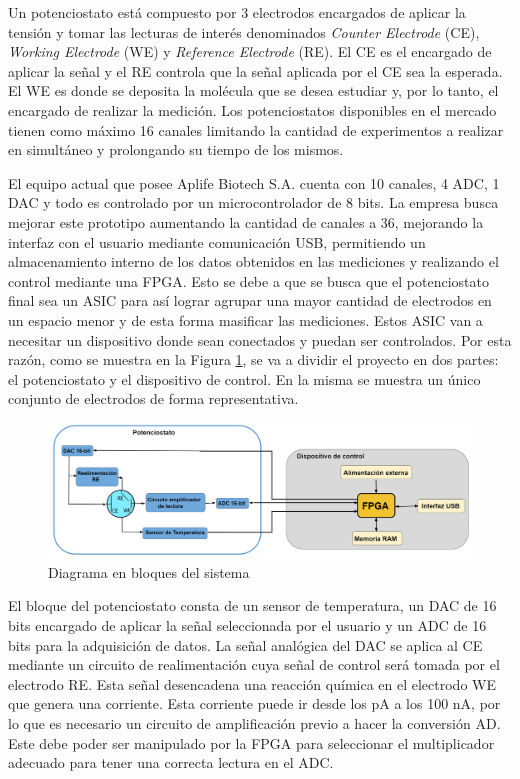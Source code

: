 \documentclass[11pt]{charter}
\begin{document}
Un potenciostato está compuesto por 3 electrodos encargados de aplicar la tensión y tomar las lecturas de interés denominados \textit{Counter Electrode} (CE), \textit{Working Electrode} (WE) y \textit{Reference Electrode} (RE). El CE es el encargado de aplicar la señal y el RE controla que la señal aplicada por el CE sea la esperada. El WE es donde se deposita la molécula que se desea estudiar y, por lo tanto, el encargado de realizar la medición. Los potenciostatos disponibles en el mercado tienen como máximo 16  canales limitando la cantidad de experimentos a realizar en simultáneo y prolongando su tiempo de los mismos. 

El equipo actual que posee Aplife Biotech S.A. cuenta con 10 canales, 4 ADC, 1 DAC y todo es controlado por un microcontrolador de 8 bits. La empresa busca mejorar este prototipo aumentando la cantidad de canales a 36, mejorando la interfaz con el usuario mediante comunicación USB, permitiendo un almacenamiento interno de los datos obtenidos en las mediciones y realizando el control mediante una FPGA. Esto se debe a que se busca que el potenciostato final sea un ASIC para así lograr agrupar una mayor cantidad de electrodos en un espacio menor y de esta forma masificar las mediciones. Estos ASIC van a necesitar un dispositivo donde sean conectados y puedan ser controlados. Por esta razón, como se muestra en la Figura \ref{fig:diagBloques}, se va a dividir el proyecto en dos partes: el potenciostato y el dispositivo de control. En la misma se muestra un único conjunto de electrodos de forma representativa.

\begin{figure}[!ht]
\centering 
\includegraphics[width=1\textwidth]{./Figuras/diagrama_bloques.png}
\caption{Diagrama en bloques del sistema}
\label{fig:diagBloques}
\end{figure}

El bloque del potenciostato consta de un sensor de temperatura, un DAC de 16 bits encargado de aplicar la señal seleccionada por el usuario y un ADC de 16 bits para la adquisición de datos. La señal analógica del DAC se aplica al CE mediante un circuito de realimentación cuya señal de control será tomada por el electrodo RE. Esta señal desencadena una reacción química en el electrodo WE que genera una corriente. Esta corriente puede ir desde los pA a los 100 nA, por lo que es necesario un circuito de amplificación previo a hacer la conversión AD. Este debe poder ser manipulado por la FPGA para seleccionar el multiplicador adecuado para tener una correcta lectura en el ADC.
 
\end{document}
